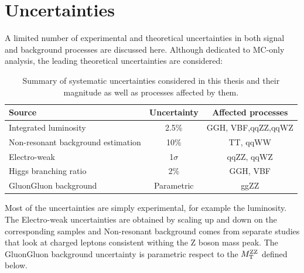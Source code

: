 \section{Uncertainties}
A limited number of experimental and theoretical uncertainties in both signal and background
processes are discussed here. Although dedicated to MC-only analysis, the leading theoretical
uncertainties are considered:
\begin{table}[hbt]
    \centering
\begin{tabular}{lcc}
\hline
Source                             & Uncertainty            & Affected processes \\ \hline
Integrated luminosity              & 2.5\%                  & GGH, VBF,qqZZ,qqWZ \\
Non-resonant background estimation & 10\%                   & TT, qqWW           \\
Electro-weak                       & 1$\sigma$ & qqZZ, qqWZ         \\
Higgs branching ratio              & 2\%                    & GGH, VBF           \\
GluonGluon background              & Parametric                   & ggZZ
\end{tabular}
\caption{Summary of systematic uncertainties considered in this thesis and their
magnitude as well as processes affected by them.}
\label{tab:systs}
\end{table}

Most of the uncertainties are simply experimental, for example the luminosity. The Electro-weak
uncertainties are obtained by scaling up and down on the corresponding samples and Non-resonant
background comes from separate studies that look at charged leptons consistent withing the Z boson
mass peak. The GluonGluon background uncertainty is parametric respect to the $M_\mathrm{T}^{\mathrm{ZZ}}$ defined below.

